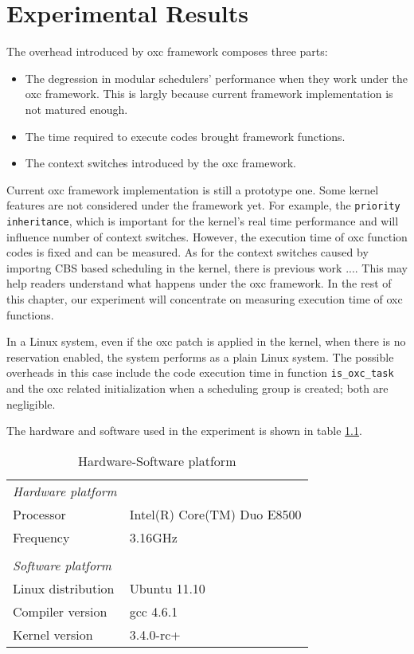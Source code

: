 \chapter{Experimental Results\label{chap:exp}}
The overhead introduced by oxc framework composes three parts:
\begin{itemize}
\item The degression in modular schedulers' performance when they 
	work under the oxc framework. This is largly because current
	framework implementation is not matured enough.
\item The time required to execute codes brought framework functions.
\item The context switches introduced by the oxc framework.
\end{itemize}

Current oxc framework implementation is still a prototype one. Some kernel 
features are not considered under the framework yet. For example, the 
\texttt{priority inheritance}, which is important for the kernel's real time
performance and will influence number of context switches. 
However, the execution time of oxc function codes is fixed and can be measured.
As for the context switches caused by importng CBS based scheduling in the
kernel, there is previous work .... This may help readers understand what 
happens under the oxc framework. In the rest of this chapter, our experiment
will concentrate on measuring execution time of oxc functions.

In a Linux system, even if the oxc patch is applied in the kernel, when there 
is no reservation enabled, the system performs as a plain Linux system. 
The possible overheads in this case include the code execution time in 
function \texttt{is\_oxc\_task} and the oxc related initialization when a 
scheduling group is created; both are negligible.

The hardware and software used in the experiment is shown in 
table \ref{tab:exp_setup}.
\begin{table}[thbp]
  \centering
  \begin{tabular}{ll}\hline
	\emph{Hardware platform}\hspace{4cm}		& 	\\
	Processor			& Intel(R) Core(TM) Duo E8500	 \\
	Frequency			& 3.16GHz\\
					&	\\	
	\emph{Software platform}\hspace{4cm}		& 	\\
	Linux distribution		& Ubuntu 11.10\\
	Compiler version		& gcc 4.6.1\\
	Kernel version			& 3.4.0-rc+ \\\hline
  \end{tabular}
  \caption{Hardware-Software platform}
  \label{tab:exp_setup}
\end{table}
